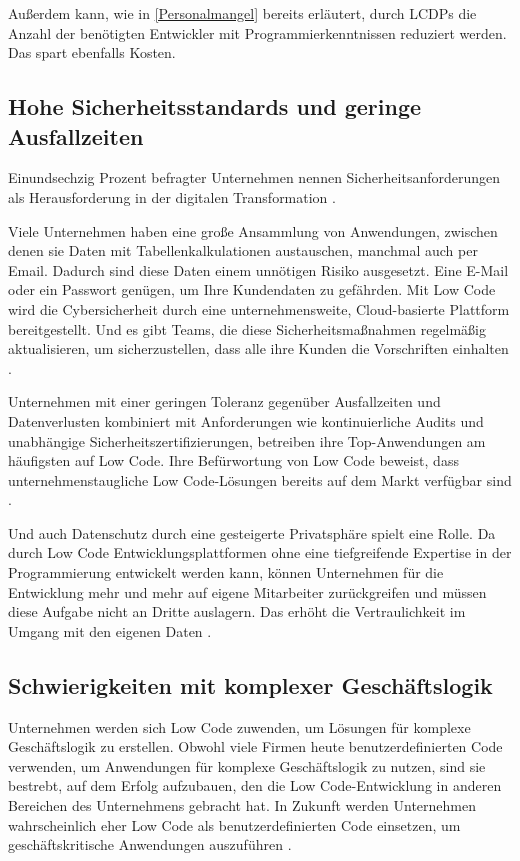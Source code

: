 \documentclass[12pt]{article} %
\begin{document}
	Außerdem kann, wie in \ref{Personalmangel} bereits erläutert, durch LCDPs die Anzahl der benötigten Entwickler mit Programmierkenntnissen reduziert werden. Das spart ebenfalls Kosten.  
	
	\subsection{Hohe Sicherheitsstandards und geringe Ausfallzeiten} 
	Einundsechzig Prozent befragter Unternehmen nennen Sicherheitsanforderungen als Herausforderung in der digitalen Transformation \autocite{EmmaVanPelt.2019}. \newline  %
	
	Viele Unternehmen haben eine große Ansammlung von Anwendungen, zwischen denen sie Daten mit Tabellenkalkulationen austauschen, manchmal auch per Email. Dadurch sind diese Daten einem unnötigen Risiko ausgesetzt. Eine E-Mail oder ein Passwort genügen, um Ihre Kundendaten zu gefährden. Mit Low Code wird die Cybersicherheit durch eine unternehmensweite, Cloud-basierte Plattform bereitgestellt. Und es gibt Teams, die diese Sicherheitsmaßnahmen regelmäßig aktualisieren, um sicherzustellen, dass alle ihre Kunden die Vorschriften einhalten \autocite{KevinShuler.2023}. \newline
	
	Unternehmen mit einer geringen Toleranz gegenüber Ausfallzeiten und Datenverlusten kombiniert mit Anforderungen wie kontinuierliche Audits und unabhängige Sicherheitszertifizierungen, betreiben ihre Top-Anwendungen am häufigsten auf Low Code. Ihre Befürwortung von Low Code beweist, dass unternehmenstaugliche Low Code-Lösungen bereits auf dem Markt verfügbar sind \autocite{EmmaVanPelt.2019}. \newline
	
	Und auch Datenschutz durch eine gesteigerte Privatsphäre spielt eine Rolle. Da durch Low Code Entwicklungsplattformen ohne eine tiefgreifende Expertise in der Programmierung entwickelt werden kann, können Unternehmen für die Entwicklung mehr und mehr auf eigene Mitarbeiter zurückgreifen und müssen diese Aufgabe nicht an Dritte auslagern. Das erhöht die Vertraulichkeit im Umgang mit den eigenen Daten \autocite{Sanchis.2020b}.
	
	\subsection{Schwierigkeiten mit komplexer Geschäftslogik}
	Unternehmen werden sich Low Code zuwenden, um Lösungen für komplexe Geschäftslogik zu erstellen.
	Obwohl viele Firmen heute benutzerdefinierten Code verwenden, um Anwendungen für komplexe Geschäftslogik zu nutzen, sind sie bestrebt, auf dem Erfolg aufzubauen, den die Low Code-Entwicklung in anderen Bereichen des Unternehmens gebracht hat. In Zukunft werden Unternehmen wahrscheinlich eher Low Code als benutzerdefinierten Code einsetzen, um geschäftskritische Anwendungen auszuführen \autocite{EmmaVanPelt.2019}.
	
\end{document}
